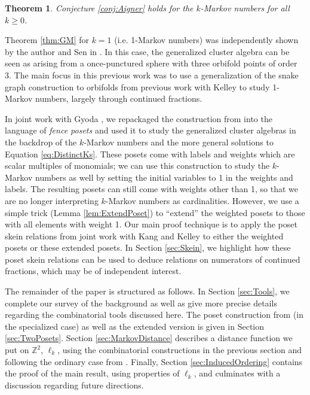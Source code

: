 \documentclass[12pt, letterpaper,table]{amsart}
\newtheorem{theorem}{Theorem}
\theoremstyle{remark}
\begin{document}
\begin{theorem}\label{thm:Main}
Conjecture \ref{conj:Aigner} holds for the $k$-Markov numbers for all $k \geq 0$.
\end{theorem}

 Theorem \ref{thm:GM} for $k = 1$ (i.e. 1-Markov numbers) was independently shown by the author and Sen in \cite{banaian2024generalization}. In this case, the generalized cluster algebra can be seen as arising from a once-punctured sphere with three orbifold points of order 3. The main focus in this previous work was to use a generalization of the snake graph construction to orbifolds from previous work with Kelley \cite{BanaianKelley} to study 1-Markov numbers, largely through continued fractions.

In joint work with Gyoda \cite{BG}, we repackaged the construction from \cite{BanaianKelley} into the language of \emph{fence posets} and used it to study  the generalized cluster algebras in the backdrop of the $k$-Markov numbers and the more general solutions to Equation \ref{eq:DistinctKs}. These posets come with labels and weights which are scalar multiples of monomials; we can use this construction to study the $k$-Markov numbers as well by setting the initial variables to 1 in the weights and labels. The resulting posets can still come with weights other than 1, so that we are no longer interpreting $k$-Markov numbers as cardinalities. However, we use a simple trick (Lemma \ref{lem:ExtendPoset}) to ``extend'' the weighted posets to those with all elements with weight 1. Our main proof technique is to apply the poset skein relations from joint work with Kang and Kelley \cite{banaian2024skein} to either the weighted posets or these extended posets. In Section \ref{sec:Skein}, we highlight how these poset skein relations can be used to deduce relations on numerators of continued fractions, which may be of independent interest.

The remainder of the paper is structured as follows. In Section \ref{sec:Tools}, we complete our survey of the background as well as give more precise details regarding the combinatorial tools discussed here. The poset construction from \cite{BG} (in the specialized case) as well as the extended version is given in Section \ref{sec:TwoPosets}. Section \ref{sec:MarkovDistance} describes a distance function we put on $\mathbb{Z}^2$, $\ell_k$,  using the combinatorial constructions in the previous section and following the ordinary case from \cite{LLRS}. Finally, Section \ref{sec:InducedOrdering} contains the proof of the main result, using properties of $\ell_k$, and culminates with a discussion regarding future directions.
\end{document}
